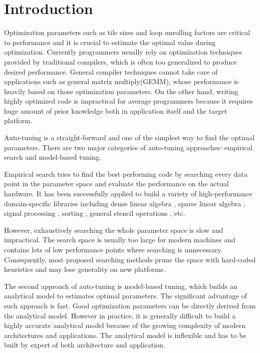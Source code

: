 \section{Introduction}
\label{sec:intro}


Optimization parameters such as tile sizes and loop unrolling factors are critical to performance and it
is crucial to estimate the optimal value during optimization.
Currently programmers usually rely on optimization techniques provided by traditional compilers, which
is often too generalized to produce desired performance.
General compiler techniques cannot take care of applications such as general matrix multiply(GEMM),
whose performance is heavily based on those optimization parameters.
On the other hand, writing highly optimized code is impractical for average
programmers because it requires huge amount of prior knowledge both in application
itself and the target platform.


\par

Auto-tuning is a straight-forward and one of the simplest way to find the optimal parameters.
There are two major categories of auto-tuning approaches: empirical search and model-based tuning.
\par
Empirical search tries to find the best performing code by searching every data point in
the parameter space and evaluate the performance on the actual hardware.
It has been successfully applied to build a variety
of high-performance domain-specific libraries including
dense linear algebra \cite{whaley2001automated}\cite{bilmes2014optimizing}, 
sparse linear algebra \cite{vuduc2005oski}, signal processing
\cite{frigo2005design}\cite{puschel2005spiral}, sorting \cite{li2004dynamically},
general stencil operations \cite{kamil2010auto}, etc.
\par
However, exhaustively searching the whole parameter space is slow and impractical.
The search space is usually too large for modern machines and contains lots of low performance points where
searching is unnecessary. Consequently, most proposed searching methods
prune the space with hard-coded heuristics and may lose generality on new platforms.

\par
The second approach of auto-tuning is model-based tuning, which builds an analytical model
to estimates optimal parameters. The significant advantage of such approach is fast. Good optimization
parameters can be directly derived from the analytical model.
However in practice, it is generally difficult to build a highly accurate analytical model because of the growing complexity
of modern architectures and applications. The analytical model is inflexible and has to be built by expert of both architecture
and application.

